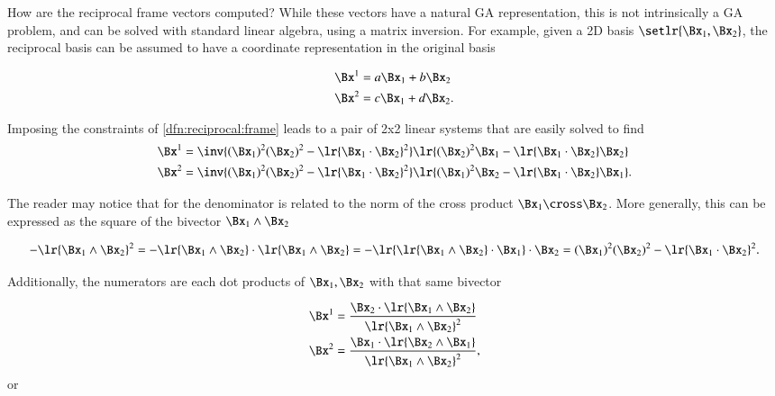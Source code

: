 %
%
How are the reciprocal frame vectors computed?  While these vectors have a natural GA representation, this is not intrinsically a GA problem, and can be solved with standard linear algebra, using a matrix inversion.
For example, given a 2D basis \( \setlr{ \Bx_1, \Bx_2 } \), the reciprocal basis can be assumed to have a coordinate representation in the original basis

\begin{dmath}\label{eqn:reciprocal_R2:100}
\begin{aligned}
\Bx^1 &= a \Bx_1 + b \Bx_2 \\
\Bx^2 &= c \Bx_1 + d \Bx_2.
\end{aligned}
\end{dmath}

Imposing the constraints of \cref{dfn:reciprocal:frame} leads to a pair of 2x2 linear systems that are easily solved to find
\begin{dmath}\label{eqn:reciprocal_R2:120}
\begin{aligned}
\Bx^1 &= \inv{ (\Bx_1)^2 (\Bx_2)^2 - \lr{ \Bx_1 \cdot \Bx_2}^2 } \lr{ (\Bx_2)^2 \Bx_1 - \lr{ \Bx_1 \cdot \Bx_2 } \Bx_2 } \\
\Bx^2 &= \inv{ (\Bx_1)^2 (\Bx_2)^2 - \lr{ \Bx_1 \cdot \Bx_2}^2 } \lr{ (\Bx_1)^2 \Bx_2 - \lr{ \Bx_1 \cdot \Bx_2 } \Bx_1 }.
\end{aligned}
\end{dmath}

The reader may notice that for  the denominator is related to the norm of the cross product \( \Bx_1 \cross \Bx_2 \).
More generally, this can be expressed as the square of the bivector \( \Bx_1 \wedge \Bx_2 \)

\begin{dmath}\label{eqn:reciprocal_R2:140}
-\lr{\Bx_1 \wedge \Bx_2 }^2
=
-\lr{\Bx_1 \wedge \Bx_2 } \cdot \lr{\Bx_1 \wedge \Bx_2 }
=
-\lr{ \lr{\Bx_1 \wedge \Bx_2 } \cdot \Bx_1 } \cdot \Bx_2
=
(\Bx_1)^2 (\Bx_2)^2 - \lr{\Bx_1 \cdot \Bx_2}^2.
\end{dmath}

Additionally, the numerators are each dot products of \( \Bx_1, \Bx_2 \) with that same bivector

\begin{dmath}\label{eqn:reciprocal_R2:160}
\begin{aligned}
\Bx^1 &= \frac{\Bx_2 \cdot \lr{ \Bx_1 \wedge \Bx_2 } }{ \lr{ \Bx_1 \wedge \Bx_2}^2 } \\
\Bx^2 &= \frac{\Bx_1 \cdot \lr{ \Bx_2 \wedge \Bx_1 } }{ \lr{ \Bx_1 \wedge \Bx_2}^2 },
\end{aligned}
\end{dmath}
or

